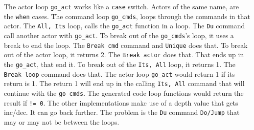 The actor loop \texttt{go\_act} works like a \texttt{case} switch.
Actors of the same name, are the \texttt{when} cases. The command loop
\texttt{go\_cmds}, loops through the commands in that actor. The
\texttt{All,\ Its} loop, calls the \texttt{go\_act} function in a loop.
The \texttt{Du} command call another actor with \texttt{go\_act}. To
break out of the \texttt{go\_cmds}'s loop, it uses a break to end the
loop. The \texttt{Break\ cmd} command and \texttt{Unique} does that. To
break out of the actor loop, it returns 2. The \texttt{Break\ actor}
does that. That ends up in the \texttt{go\_act}, that end it. To break
out of the \texttt{Its,\ All} loop, it returns 1. The
\texttt{Break\ loop} command does that. The actor loop \texttt{go\_act}
would return 1 if its return is 1. The return 1 will end up in the
calling \texttt{Its,\ All} command that will continue with the
\texttt{go\_cmds}. The generated code loop functions would return the
result if \texttt{!=\ 0}. The other implementations make use of a depth
value that gets inc/dec. It can go back further. The problem is the
\texttt{Du} command \texttt{Do/Jump} that may or may not be between the
loops.
